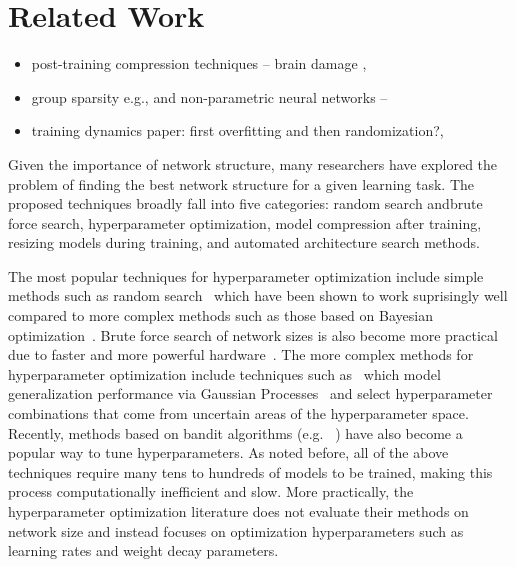 \section{Related Work}

\begin{itemize}
  \item post-training compression techniques -- brain damage , 
  \item group sparsity e.g., \cite{Scardapane2017} and non-parametric neural networks -- 
  \item training dynamics paper: first overfitting and then randomization?, 
\end{itemize}

Given the importance of network structure, many researchers have explored the
problem of finding the best network structure for a given learning task.  
The proposed techniques broadly fall into five categories: 
random search andbrute force search,
hyperparameter optimization,
model compression after training,
resizing models during training, and 
automated architecture search methods.

The most popular techniques for hyperparameter optimization include simple
methods such as random search~\cite{BergstraJAMESBERGSTRA2012} which have been
shown to work suprisingly well compared to more complex methods such as those
based on Bayesian optimization~\cite{Snoek12}.
Brute force search of network sizes is also become more practical due to faster
and more powerful hardware~\cite{molchanov2016pruning}.
The more complex methods for hyperparameter optimization include techniques 
such as~\cite{Snoek12} which model generalization performance via Gaussian
Processes~\cite{GaussianProcesses} and select hyperparameter combinations that
come from uncertain areas of the hyperparameter space.  
Recently, methods based
on bandit algorithms (e.g. ~\cite{li2016hyperband, jamieson2016}) have also
become a popular way to tune hyperparameters.
As noted before, all of the
above techniques require many tens to hundreds of models to be trained, making
this process computationally inefficient and slow.
More practically, the hyperparameter optimization literature does not evaluate
their methods on network size and instead focuses on optimization hyperparameters
such as learning rates and weight decay parameters.


